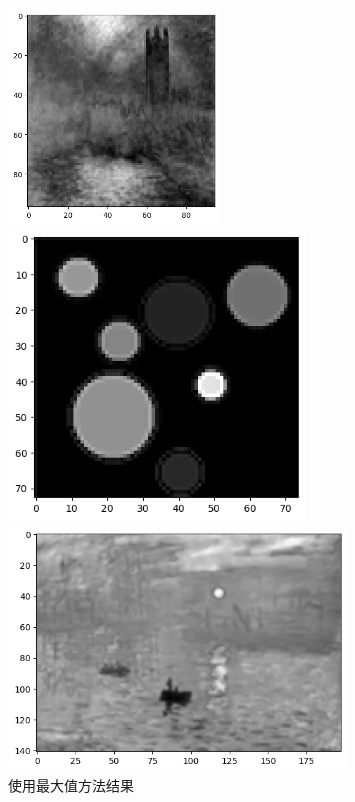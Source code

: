 \documentclass{article}
\begin{document}
\begin{figure}[htbp]
	\centering
		\begin{minipage}[c]{0.3\textwidth} %
			\centering
			\includegraphics[width=0.5\textwidth]{./report/output7.png} %
			
		\end{minipage}%
		\begin{minipage}[c]{0.2\textwidth}
			\centering
			\includegraphics[width=0.7\textwidth]{./report/output8.png}
			
		\end{minipage}
		\begin{minipage}[c]{0.2\textwidth}
			\centering
			\includegraphics[width=0.8\textwidth]{./report/output9.png}
			
		\end{minipage}
		\caption*{使用最大值方法结果}
\end{figure}
\end{document}
